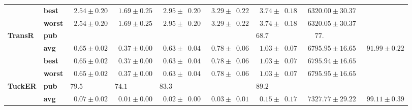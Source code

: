 \begin{tabular}{llrrrrrrr}
       & \textbf{best} &  $\phantom{0}2.54 \pm 0.20$ &  $\phantom{0}1.69 \pm 0.25$ &  $\phantom{0}2.95 \pm \phantom{0}0.20$ &  $\phantom{0}3.29 \pm \phantom{0}0.22$ &  $\phantom{0}3.74 \pm \phantom{0}0.18$ &            $\phantom{0}6320.00 \pm 30.37$ &                              \\
       & \textbf{worst} &  $\phantom{0}2.54 \pm 0.20$ &  $\phantom{0}1.69 \pm 0.25$ &  $\phantom{0}2.95 \pm \phantom{0}0.20$ &  $\phantom{0}3.29 \pm \phantom{0}0.22$ &  $\phantom{0}3.74 \pm \phantom{0}0.18$ &            $\phantom{0}6320.05 \pm 30.37$ &                              \\\midrule
\textbf{TransR} & \textbf{pub} &                             &                             &                                        &                                        &            $68.7\phantom{0 \pm 00.00}$ &  $\phantom{000}77.\phantom{00 \pm 00.00}$ &                              \\
       & \textbf{avg} &  $\phantom{0}0.65 \pm 0.02$ &  $\phantom{0}0.37 \pm 0.00$ &  $\phantom{0}0.63 \pm \phantom{0}0.04$ &  $\phantom{0}0.78 \pm \phantom{0}0.06$ &  $\phantom{0}1.03 \pm \phantom{0}0.07$ &            $\phantom{0}6795.95 \pm 16.65$ &  $\phantom{0}91.99 \pm 0.22$ \\
       & \textbf{best} &  $\phantom{0}0.65 \pm 0.02$ &  $\phantom{0}0.37 \pm 0.00$ &  $\phantom{0}0.63 \pm \phantom{0}0.04$ &  $\phantom{0}0.78 \pm \phantom{0}0.06$ &  $\phantom{0}1.03 \pm \phantom{0}0.07$ &            $\phantom{0}6795.94 \pm 16.65$ &                              \\
       & \textbf{worst} &  $\phantom{0}0.65 \pm 0.02$ &  $\phantom{0}0.37 \pm 0.00$ &  $\phantom{0}0.63 \pm \phantom{0}0.04$ &  $\phantom{0}0.78 \pm \phantom{0}0.06$ &  $\phantom{0}1.03 \pm \phantom{0}0.07$ &            $\phantom{0}6795.95 \pm 16.65$ &                              \\\midrule
\textbf{TuckER} & \textbf{pub} &  $79.5\phantom{0 \pm 0.00}$ &  $74.1\phantom{0 \pm 0.00}$ &            $83.3\phantom{0 \pm 00.00}$ &                                        &            $89.2\phantom{0 \pm 00.00}$ &                                           &                              \\
       & \textbf{avg} &  $\phantom{0}0.07 \pm 0.02$ &  $\phantom{0}0.01 \pm 0.00$ &  $\phantom{0}0.02 \pm \phantom{0}0.00$ &  $\phantom{0}0.03 \pm \phantom{0}0.01$ &  $\phantom{0}0.15 \pm \phantom{0}0.17$ &            $\phantom{0}7327.77 \pm 29.22$ &  $\phantom{0}99.11 \pm 0.39$ \\
\bottomrule
\end{tabular}

